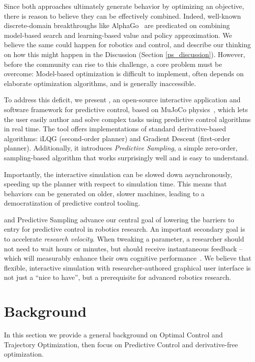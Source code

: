 Since both approaches ultimately generate behavior by optimizing an objective, there is reason to believe they can be effectively combined. Indeed, well-known discrete-domain breakthroughs like AlphaGo~\cite{silver2016mastering} are predicated on combining model-based search and learning-based value and policy approximation. We believe the same could happen for robotics and control, and describe our thinking on how this might happen in the Discussion (Section \ref{ps_discussion}). However, before the community can rise to this challenge, a core problem must be overcome: Model-based optimization is difficult to implement, often depends on elaborate optimization algorithms, and is generally inaccessible. 

To address this deficit, we present \textit{\app{}}, an open-source interactive application and software framework for predictive control, based on MuJoCo physics~\cite{todorov2012mujoco}, which lets the user easily author and solve complex tasks using predictive control algorithms in real time. The tool offers implementations of standard derivative-based algorithms: iLQG (second-order planner) and Gradient Descent (first-order planner).  Additionally, it introduces \emph{Predictive Sampling}, a simple zero-order, sampling-based algorithm that works surprisingly well and is easy to understand. 

Importantly, the interactive simulation can be slowed down asynchronously, speeding up the planner with respect to simulation time. This means that behaviors can be generated on older, slower machines, leading to a democratization of predictive control tooling.

\app{} and Predictive Sampling advance our central goal of lowering the barriers to entry for predictive control in robotics research. An important secondary goal is to accelerate \textit{research velocity}. When tweaking a parameter, a researcher should not need to wait hours or minutes, but should receive instantaneous feedback -- which will measurably enhance their own cognitive performance~\cite{lu2022current}. We believe that flexible, interactive simulation with researcher-authored graphical user interface is not just a ``nice to have'', but a prerequisite for advanced robotics research.

\section{Background} \label{ps_background}

In this section we provide a general background on Optimal Control and Trajectory Optimization, then focus on Predictive Control and derivative-free optimization.

